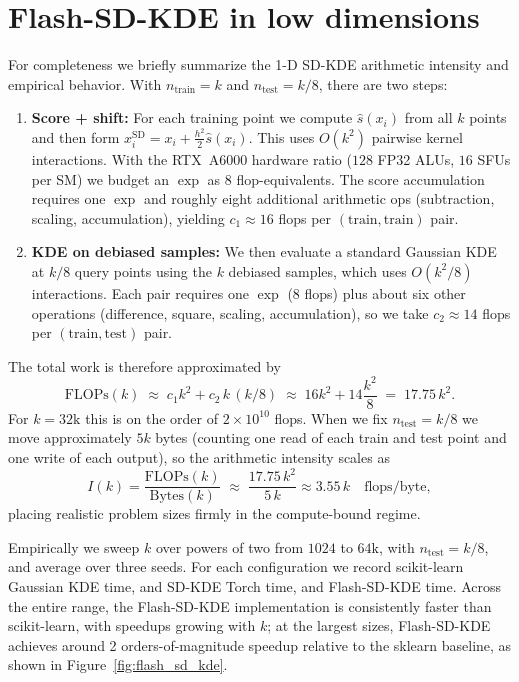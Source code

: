 \appendix
\section{Flash-SD-KDE in low dimensions}

For completeness we briefly summarize the 1-D SD-KDE arithmetic intensity and
empirical behavior.  With $n_{\text{train}} = k$ and $n_{\text{test}} = k/8$,
there are two steps:
\begin{enumerate}
  \item \textbf{Score + shift:} For each training point we compute
        $\hat s(x_i)$ from all $k$ points and then form
        $x_i^{\mathrm{SD}} = x_i + \tfrac{h^2}{2}\hat s(x_i)$.  This uses
        $O(k^2)$ pairwise kernel interactions.  With the RTX~A6000 hardware
        ratio ($128$ FP32 ALUs, $16$ SFUs per SM) we budget an $\exp$ as
        $8$ flop-equivalents.  The score accumulation requires one $\exp$
        and roughly eight additional arithmetic ops (subtraction, scaling,
        accumulation), yielding $c_1 \approx 16$ flops per
        $(\text{train},\text{train})$ pair.
  \item \textbf{KDE on debiased samples:} We then evaluate a standard Gaussian
        KDE at $k/8$ query points using the $k$ debiased samples, which uses
        $O(k^2/8)$ interactions.  Each pair requires one $\exp$ (8 flops) plus
        about six other operations (difference, square, scaling, accumulation),
        so we take $c_2 \approx 14$ flops per $(\text{train},\text{test})$ pair.
\end{enumerate}
The total work is therefore approximated by
\[
  \text{FLOPs}(k)
  \;\approx\;
  c_1 k^2 + c_2\,k\,(k/8)
  \;\approx\;
  16 k^2 + 14\frac{k^2}{8}
  \;=\;
  17.75\,k^2.
\]
For $k = 32\text{k}$ this is on the order of $2\times 10^{10}$ flops.  When we
fix $n_{\text{test}} = k/8$ we move approximately $5k$ bytes (counting one
read of each train and test point and one write of each output), so the
arithmetic intensity scales as
\[
  I(k)
  =
  \frac{\text{FLOPs}(k)}{\text{Bytes}(k)}
  \;\approx\;
  \frac{17.75\,k^2}{5\,k}
  \approx
  3.55\,k
  \quad \text{flops/byte},
\]
placing realistic problem sizes firmly in the compute-bound regime.

Empirically we sweep $k$ over powers of two from $1024$ to $64\text{k}$, with
$n_{\text{test}} = k/8$, and average over three seeds.  For each
configuration we record scikit-learn Gaussian KDE
time, and SD-KDE Torch time, and Flash-SD-KDE time.  Across the entire range, the Flash-SD-KDE
implementation is consistently faster than scikit-learn, with speedups
growing with $k$; at the largest sizes, Flash-SD-KDE achieves around 2 orders-of-magnitude speedup relative to the sklearn baseline, as shown in Figure~\ref{fig:flash_sd_kde}.

